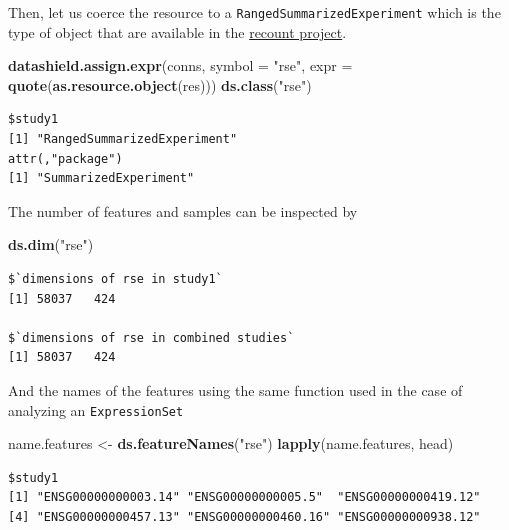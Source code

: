 \documentclass[]{article}
\newenvironment{Shaded}{\begin{snugshade}}{\end{snugshade}}
\newcommand{\DataTypeTok}[1]{\textcolor[rgb]{0.13,0.29,0.53}{#1}}
\newcommand{\KeywordTok}[1]{\textcolor[rgb]{0.13,0.29,0.53}{\textbf{#1}}}
\newcommand{\NormalTok}[1]{#1}
\newcommand{\StringTok}[1]{\textcolor[rgb]{0.31,0.60,0.02}{#1}}
\begin{document}
Then, let us coerce the resource to a
\texttt{RangedSummarizedExperiment} which is the type of object that are
available in the
\href{https://jhubiostatistics.shinyapps.io/recount/}{recount project}.

\begin{Shaded}
\begin{Highlighting}[]
\KeywordTok{datashield.assign.expr}\NormalTok{(conns, }\DataTypeTok{symbol =} \StringTok{"rse"}\NormalTok{, }
                       \DataTypeTok{expr =} \KeywordTok{quote}\NormalTok{(}\KeywordTok{as.resource.object}\NormalTok{(res)))}
\KeywordTok{ds.class}\NormalTok{(}\StringTok{"rse"}\NormalTok{)}
\end{Highlighting}
\end{Shaded}

\begin{verbatim}
$study1
[1] "RangedSummarizedExperiment"
attr(,"package")
[1] "SummarizedExperiment"
\end{verbatim}

The number of features and samples can be inspected by

\begin{Shaded}
\begin{Highlighting}[]
\KeywordTok{ds.dim}\NormalTok{(}\StringTok{"rse"}\NormalTok{)}
\end{Highlighting}
\end{Shaded}

\begin{verbatim}
$`dimensions of rse in study1`
[1] 58037   424

$`dimensions of rse in combined studies`
[1] 58037   424
\end{verbatim}

And the names of the features using the same function used in the case
of analyzing an \texttt{ExpressionSet}

\begin{Shaded}
\begin{Highlighting}[]
\NormalTok{name.features <{-}}\StringTok{ }\KeywordTok{ds.featureNames}\NormalTok{(}\StringTok{"rse"}\NormalTok{)}
\KeywordTok{lapply}\NormalTok{(name.features, head)}
\end{Highlighting}
\end{Shaded}

\begin{verbatim}
$study1
[1] "ENSG00000000003.14" "ENSG00000000005.5"  "ENSG00000000419.12"
[4] "ENSG00000000457.13" "ENSG00000000460.16" "ENSG00000000938.12"
\end{verbatim}
\end{document}
